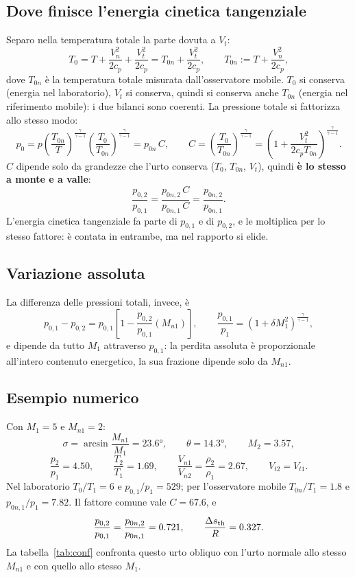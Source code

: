 \documentclass[11pt,a4paper]{article}
\newcommand{\sth}{s_{\rm th}}
\newcommand{\Mn}{M_{n1}}
\newcommand{\kk}{\frac{\gamma}{\gamma-1}}
\begin{document}
\subsection{Dove finisce l'energia cinetica tangenziale}
Separo nella temperatura totale la parte dovuta a $V_t$:
\[
  T_0=T+\frac{V_n^2}{2c_p}+\frac{V_t^2}{2c_p}=T_{0n}+\frac{V_t^2}{2c_p},
  \qquad T_{0n}:=T+\frac{V_n^2}{2c_p},
\]
dove $T_{0n}$ è la temperatura totale misurata dall'osservatore mobile. $T_0$ si conserva (energia nel
laboratorio), $V_t$ si conserva, quindi si conserva anche $T_{0n}$ (energia nel riferimento mobile): i due bilanci
sono coerenti. La pressione totale si fattorizza allo stesso modo:
\[
  p_0=p\left(\frac{T_{0n}}{T}\right)^{\kk}\left(\frac{T_0}{T_{0n}}\right)^{\kk}=p_{0n}\,C,
  \qquad C=\left(\frac{T_0}{T_{0n}}\right)^{\kk}=\left(1+\frac{V_t^2}{2c_pT_{0n}}\right)^{\kk}.
\]
$C$ dipende solo da grandezze che l'urto conserva ($T_0$, $T_{0n}$, $V_t$), quindi \textbf{è lo stesso a monte e
a valle}:
\[
  \frac{p_{0,2}}{p_{0,1}}=\frac{p_{0n,2}\,C}{p_{0n,1}\,C}=\frac{p_{0n,2}}{p_{0n,1}} .
\]
L'energia cinetica tangenziale fa parte di $p_{0,1}$ e di $p_{0,2}$, e le moltiplica per lo stesso fattore: è
contata in entrambe, ma nel rapporto si elide.

\subsection{Variazione assoluta}
La differenza delle pressioni totali, invece, è
\[
  p_{0,1}-p_{0,2}=p_{0,1}\left[1-\frac{p_{0,2}}{p_{0,1}}(\Mn)\right],\qquad
  \frac{p_{0,1}}{p_1}=\left(1+\delta M_1^2\right)^{\kk},
\]
e dipende da tutto $M_1$ attraverso $p_{0,1}$: la perdita assoluta è proporzionale all'intero contenuto energetico,
la sua frazione dipende solo da $\Mn$.

\subsection{Esempio numerico}
Con $M_1=5$ e $\Mn=2$:
\[
  \sigma=\arcsin\frac{\Mn}{M_1}=\ang{23.6},\qquad \theta=\ang{14.3},\qquad M_2=\num{3.57},
\]
\[
  \frac{p_2}{p_1}=\num{4.50},\qquad \frac{T_2}{T_1}=\num{1.69},\qquad
  \frac{V_{n1}}{V_{n2}}=\frac{\rho_2}{\rho_1}=\num{2.67},\qquad V_{t2}=V_{t1}.
\]
Nel laboratorio $T_0/T_1=6$ e $p_{0,1}/p_1=529$; per l'osservatore mobile $T_{0n}/T_1=\num{1.8}$ e
$p_{0n,1}/p_1=\num{7.82}$. Il fattore comune vale $C=\num{67.6}$, e
\[
  \frac{p_{0,2}}{p_{0,1}}=\frac{p_{0n,2}}{p_{0n,1}}=\num{0.721},\qquad
  \frac{\Delta\sth}{R}=\num{0.327} .
\]
La tabella~\ref{tab:conf} confronta questo urto obliquo con l'urto normale allo stesso $\Mn$ e con quello
allo stesso $M_1$.
\end{document}
